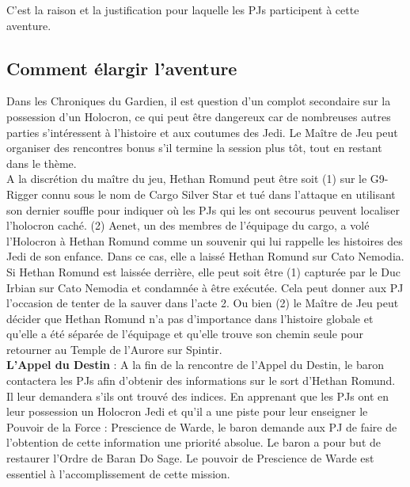 \documentclass[twoside]{article}
\begin{document}
C'est la raison et la justification pour laquelle les PJs participent à cette aventure.

\subsection{Comment élargir l'aventure}
Dans les Chroniques du Gardien, il est question d'un complot secondaire sur la possession d'un Holocron, ce qui peut être dangereux car de nombreuses autres parties s'intéressent à l'histoire et aux coutumes des Jedi. Le Maître de Jeu peut organiser des rencontres bonus s'il termine la session plus tôt, tout en restant dans le thème.\\

A la discrétion du maître du jeu, Hethan Romund peut être soit (1) sur le G9-Rigger connu sous le nom de Cargo Silver Star et tué dans l'attaque en utilisant son dernier souffle pour indiquer où les PJs qui les ont secourus peuvent localiser l'holocron caché.  (2) Aenet, un des membres de l'équipage du cargo, a volé l'Holocron à Hethan Romund comme un souvenir qui lui rappelle les histoires des Jedi de son enfance. Dans ce cas, elle a laissé Hethan Romund sur Cato Nemodia. Si Hethan Romund est laissée derrière, elle peut soit être (1) capturée par le Duc Irbian sur Cato Nemodia et condamnée à être exécutée.  Cela peut donner aux PJ l'occasion de tenter de la sauver dans l'acte 2.  Ou bien (2) le Maître de Jeu peut décider que Hethan Romund n'a pas d'importance dans l'histoire globale et qu'elle a été séparée de l'équipage et qu'elle trouve son chemin seule pour retourner au Temple de l'Aurore sur Spintir.\\

\textbf{L'Appel du Destin} : A la fin de la rencontre de l'Appel du Destin, le baron contactera les PJs afin d'obtenir des informations sur le sort d'Hethan Romund. Il leur demandera s'ils ont trouvé des indices. En apprenant que les PJs ont en leur possession un Holocron Jedi et qu'il a une piste pour leur enseigner le Pouvoir de la Force : Prescience de Warde, le baron demande aux PJ de faire de l'obtention de cette information une priorité absolue.  Le baron a pour but de restaurer l'Ordre de Baran Do Sage. Le pouvoir de Prescience de Warde est essentiel à l'accomplissement de cette mission.\\
\end{document}
